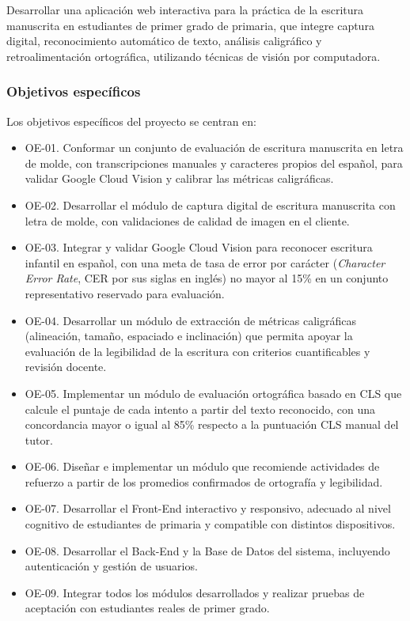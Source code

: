 Desarrollar una aplicación web interactiva para la práctica de la escritura manuscrita en estudiantes de primer grado de primaria, que integre captura digital, reconocimiento automático de texto, análisis caligráfico y retroalimentación ortográfica, utilizando técnicas de visión por computadora.

\subsubsection{Objetivos específicos}

Los objetivos específicos del proyecto se centran en:

\begin{itemize}
    \item OE-01. Conformar un conjunto de evaluación de escritura manuscrita en letra de molde, con transcripciones manuales y caracteres propios del español, para validar Google Cloud Vision y calibrar las métricas caligráficas.
    \item OE-02. Desarrollar el módulo de captura digital de escritura manuscrita con letra de molde, con validaciones de calidad de imagen en el cliente.
    \item OE-03. Integrar y validar Google Cloud Vision para reconocer escritura infantil en español, con una meta de tasa de error por carácter (\textit{Character Error Rate}, CER por sus siglas en inglés) no mayor al 15\% en un conjunto representativo reservado para evaluación.
    \item OE-04. Desarrollar un módulo de extracción de métricas caligráficas (alineación, tamaño, espaciado e inclinación) que permita apoyar la evaluación de la legibilidad de la escritura con criterios cuantificables y revisión docente.
    \item OE-05. Implementar un módulo de evaluación ortográfica basado en CLS que calcule el puntaje de cada intento a partir del texto reconocido, con una concordancia mayor o igual al 85\% respecto a la puntuación CLS manual del tutor.
    \item OE-06. Diseñar e implementar un módulo que recomiende actividades de refuerzo a partir de los promedios confirmados de ortografía y legibilidad.
    \item OE-07. Desarrollar el Front-End interactivo y responsivo, adecuado al nivel cognitivo de estudiantes de primaria y compatible con distintos dispositivos.
    \item OE-08. Desarrollar el Back-End y la Base de Datos del sistema, incluyendo autenticación y gestión de usuarios.
    \item OE-09. Integrar todos los módulos desarrollados y realizar pruebas de aceptación con estudiantes reales de primer grado.
\end{itemize}


